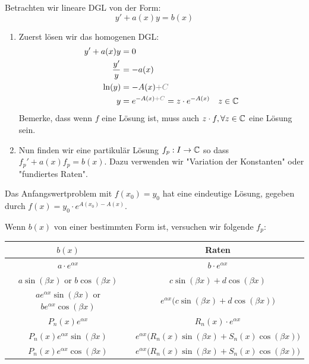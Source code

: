 
Betrachten wir lineare DGL von der Form:
$$y' + a(x)y = b(x)$$

\begin{enumerate}[label=(\arabic*)]
\item Zuerst lösen wir das homogenen DGL:
\begin{align*}
    y' + a(x)y &= 0\\
    \frac{y'}{y} &= -a(x)\\
    \ln(y) &= -A(x) \light{+C}\\
    y &= e^{-A(x) \light{+C}} = z \cdot e^{-A(x)}\quad z \in \C
 \end{align*}
Bemerke, dass wenn $f$ eine Lösung ist, muss auch $z \cdot f, \forall z \in \mathbb{C}$ eine Lösung sein.

\item Nun finden wir eine partikulär Lösung $f_p: I \to \mathbb{C}$ so dass $f_p' + a(x)f_p = b(x)$. Dazu verwenden wir "Variation
der Konstanten" oder "fundiertes Raten".
\end{enumerate}

Das Anfangswertproblem mit $f(x_0) = y_0$ hat eine eindeutige Lösung, gegeben durch $f(x) = y_0 \cdot e^{A(x_0) - A(x)}$.



Wenn $b(x)$ von einer bestimmten Form ist, versuchen wir folgende $f_p$:

\begin{center}
  \begin{tabular}{|c|c|} 
   \hline
    $b(x)$ & Raten \\ \hline
    $a \cdot e^{\alpha x}$ & $b \cdot e^{\alpha x}$\\ \hline
    $a \sin(\beta x)$ or $b \cos(\beta x)$  & $c \sin(\beta x) + d \cos(\beta x)$\\ \hline
    $a e^{\alpha x} \sin(\beta x)$ or $b e^{\alpha x} \cos(\beta x)$ & $e^{\alpha x} \Big( c \sin(\beta x) + d \cos(\beta x) \Big)$\\ \hline
    $P_n(x) e^{\alpha x}$ & $R_n(x) \cdot e^{\alpha x}$\\ \hline
    $P_n(x) e^{\alpha x} \sin(\beta x)$ & $e^{\alpha x} \Big( R_n(x) \sin(\beta x) + S_n(x) \cos(\beta x) \Big)$\\ \hline
    $P_n(x) e^{\alpha x} \cos(\beta x)$ & $e^{\alpha x} \Big( R_n(x) \sin(\beta x) + S_n(x) \cos(\beta x) \Big)$\\ \hline
  \end{tabular}
\end{center}


